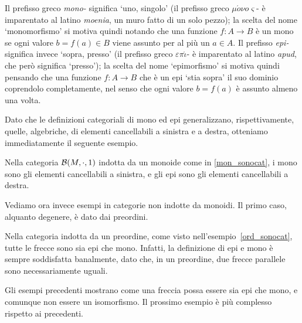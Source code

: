 \begin{terminology}
 Il prefisso greco \emph{mono-} significa `uno, singolo' (il prefisso greco \(\mu\acute{o}\nu o\varsigma\)- è imparentato al latino \emph{moenia}, un muro fatto di un solo pezzo); la scelta del nome `monomorfismo' si motiva quindi notando che una funzione \(f \colon A\to B\) è un mono se ogni valore \(b=f(a) \in B\) viene assunto per al più un \(a\in A\). Il prefisso \emph{epi-} significa invece `sopra, presso' (il prefisso greco \(\varepsilon\pi\acute{\iota}\)- è imparentato al latino \emph{apud}, che però significa `presso'); la scelta del nome `epimorfismo' si motiva quindi pensando che una funzione \(f \colon A\to B\) che è un epi `stia sopra' il suo dominio coprendolo completamente, nel senso che ogni valore \(b=f(a)\) è assunto almeno una volta.
\end{terminology}
Dato che le definizioni categoriali di mono ed epi generalizzano, rispettivamente, quelle, algebriche, di elementi cancellabili a sinistra e a destra, otteniamo immediatamente il seguente esempio.
\begin{example}
 Nella categoria \(\mathcal{B}(M,\cdot,1)\) indotta da un monoide come in \ref{mon_sonocat}, i mono sono gli elementi cancellabili a sinistra,
 e gli epi sono gli elementi cancellabili a destra.
\end{example}
Vediamo ora invece esempi in categorie non indotte da monoidi. Il primo caso, alquanto degenere, è dato dai preordini.
\begin{example}\label{ex:mono-epi-preord}
 Nella categoria indotta da un preordine, come visto nell'esempio~\ref{ord_sonocat}, tutte le frecce sono sia epi che mono. Infatti, la definizione di epi e mono è sempre soddisfatta banalmente, dato che, in un preordine, due frecce parallele sono necessariamente uguali.
\end{example}
Gli esempi precedenti mostrano come una freccia possa essere sia epi che mono, e comunque non essere un isomorfismo. Il prossimo esempio è più complesso rispetto ai precedenti.

